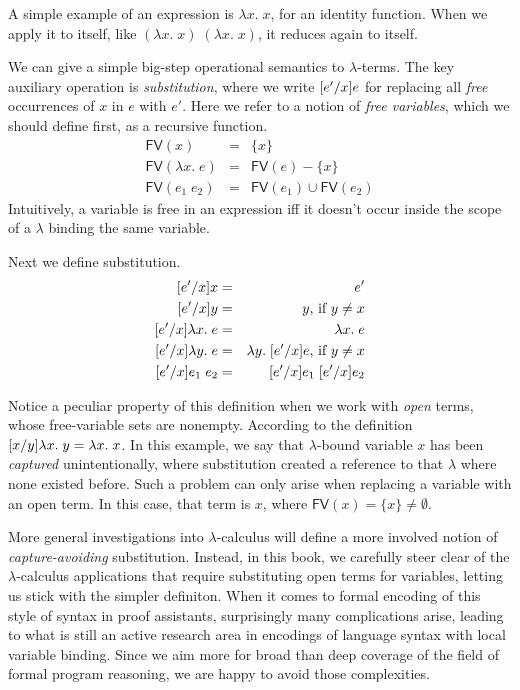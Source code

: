 \documentclass{amsbook}
\theoremstyle{definition}
\theoremstyle{remark}
\numberwithin{section}{chapter}
\numberwithin{equation}{chapter}
\begin{document}
A simple example of an expression is $\lambda x. \; x$, for an identity function.
When we apply it to itself, like $(\lambda x. \; x) \; (\lambda x. \; x)$, it reduces again to itself.

\newcommand{\fv}[1]{\textsf{FV}(#1)}

We can give a simple big-step operational semantics to $\lambda$-terms.
The key auxiliary operation is \emph{substitution}, where we write $\subst{e}{x}{e'}$ for replacing all \emph{free} occurrences of $x$ in $e$ with $e'$.
Here we refer to a notion of \emph{free variables}, which we should define first, as a recursive function.
\begin{eqnarray*}
  \fv{x} &=& \{x\} \\
  \fv{\lambda x. \; e} &=& \fv{e} - \{x\} \\
  \fv{e_1 \; e_2} &=& \fv{e_1} \cup \fv{e_2}
\end{eqnarray*}
Intuitively, a variable is free in an expression iff it doesn't occur inside the scope of a $\lambda$ binding the same variable.

Next we define substitution.
\begin{eqnarray*}
  \subst{x}{x}{e'} &=& e' \\
  \subst{y}{x}{e'} &=& y\textrm{, if $y \neq x$} \\
  \subst{\lambda x. \; e}{x}{e'} &=& \lambda x. \; e \\
  \subst{\lambda y. \; e}{x}{e'} &=& \lambda y. \; \subst{e}{x}{e'}\textrm{, if $y \neq x$} \\
  \subst{e_1 \; e_2}{x}{e'} &=& \subst{e_1}{x}{e'} \; \subst{e_2}{x}{e'}
\end{eqnarray*}

Notice a peculiar property of this definition when we work with \emph{open} terms, whose free-variable sets are nonempty.
According to the definition $\subst{\lambda x. \; y}{y}{x} = \lambda x. \; x$.
In this example, we say that $\lambda$-bound variable $x$ has been \emph{captured} unintentionally, where substitution created a reference to that $\lambda$ where none existed before.
Such a problem can only arise when replacing a variable with an open term.
In this case, that term is $x$, where $\fv{x} = \{x\} \neq \emptyset$.

More general investigations into $\lambda$-calculus will define a more involved notion of \emph{capture-avoiding} substitution.
Instead, in this book, we carefully steer clear of the $\lambda$-calculus applications that require substituting open terms for variables, letting us stick with the simpler definiton.
When it comes to formal encoding of this style of syntax in proof assistants, surprisingly many complications arise, leading to what is still an active research area in encodings of language syntax with local variable binding.
Since we aim more for broad than deep coverage of the field of formal program reasoning, we are happy to avoid those complexities.
\end{document}
